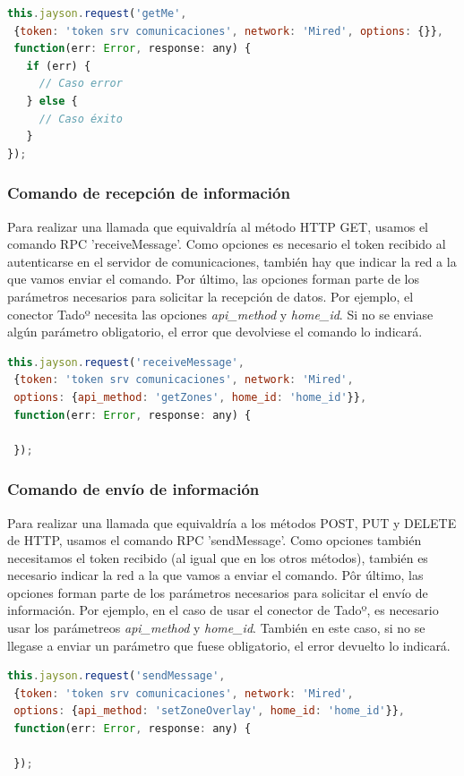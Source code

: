 \documentclass[spanish,12pt, a4paper, twoside]{paper}
\begin{document}
\begin{lstlisting}[language=Javascript]
this.jayson.request('getMe',
 {token: 'token srv comunicaciones', network: 'Mired', options: {}}, 
 function(err: Error, response: any) {
   if (err) {
     // Caso error
   } else {
     // Caso éxito
   }
});
\end{lstlisting}

\subsubsection{Comando de recepción de información}

Para realizar una llamada que equivaldría al método HTTP GET, usamos el comando RPC 'receiveMessage'. Como opciones es necesario el token recibido al autenticarse en el servidor de comunicaciones, también hay que indicar la red a la que vamos enviar el comando. Por último, las opciones forman parte de los parámetros necesarios para solicitar la recepción de datos. Por ejemplo, el conector Tadoº necesita las opciones \emph{api\_method} y \emph{home\_id}. Si no se enviase algún parámetro obligatorio, el error que devolviese el comando lo indicará.

\begin{lstlisting}[language=JavaScript]
this.jayson.request('receiveMessage',
 {token: 'token srv comunicaciones', network: 'Mired',
 options: {api_method: 'getZones', home_id: 'home_id'}}, 
 function(err: Error, response: any) {
 
 });
\end{lstlisting}

\subsubsection{Comando de envío de información}

Para realizar una llamada que equivaldría a los métodos POST, PUT y DELETE de HTTP, usamos el comando RPC 'sendMessage'. Como opciones también necesitamos el token recibido (al igual que en los otros métodos), también es necesario indicar la red a la que vamos a enviar el comando. Pôr último, las opciones forman parte de los parámetros necesarios para solicitar el envío de información. Por ejemplo, en el caso de usar el conector de Tadoº, es necesario usar los parámetreos \emph{api\_method} y \emph{home\_id}. También en este caso, si no se llegase a enviar un parámetro que fuese obligatorio, el error devuelto lo indicará.

\begin{lstlisting}[language=JavaScript]
this.jayson.request('sendMessage',
 {token: 'token srv comunicaciones', network: 'Mired',
 options: {api_method: 'setZoneOverlay', home_id: 'home_id'}}, 
 function(err: Error, response: any) {
 
 });
\end{lstlisting}
 
\end{document}
